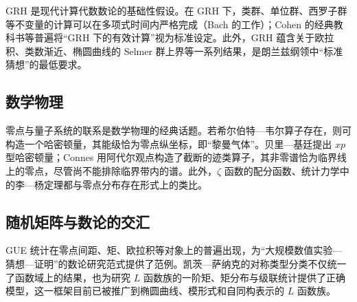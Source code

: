 GRH 是现代计算代数数论的基础性假设。在 GRH 下，类群、单位群、西罗子群等不变量的计算可以在多项式时间内严格完成（Bach 的工作）；Cohen 的经典教科书等普遍将“GRH 下的有效计算”视为标准设定。此外，GRH 蕴含关于欧拉积、类数渐近、椭圆曲线的 Selmer 群上界等一系列结果，是朗兰兹纲领中“标准猜想”的最低要求。

\subsection{数学物理}

零点与量子系统的联系是数学物理的经典话题。若希尔伯特—韦尔算子存在，则可构造一个哈密顿量，其能级恰为零点纵坐标，即“黎曼气体”。贝里—基廷提出 $xp$ 型哈密顿量\cite{berry1999heisenberg}；Connes 用阿代尔观点构造了截断的迹类算子，其非零谱恰为临界线上的零点\cite{connes1999trace}，尽管尚不能排除临界带内的谱。此外，$\zeta$ 函数的配分函数、统计力学中的李—杨定理都与零点分布存在形式上的类比。

\subsection{随机矩阵与数论的交汇}

GUE 统计在零点间距、矩、欧拉积等对象上的普遍出现，为“大规模数值实验—猜想—证明”的数论研究范式提供了范例。凯茨—萨纳克的对称类型分类\cite{katz1999zeros}不仅统一了函数域上的结果，也为研究 $L$ 函数族的一阶矩、矩分布与级联统计提供了正确模型，这一框架目前已被推广到椭圆曲线、模形式和自同构表示的 $L$ 函数族。
